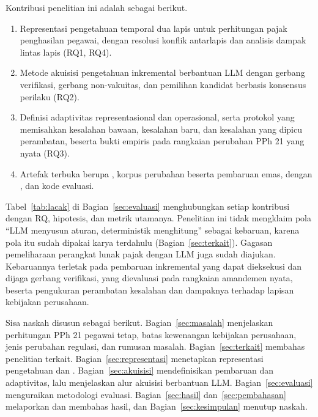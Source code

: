 Kontribusi penelitian ini adalah sebagai berikut.
\begin{enumerate}[label=\textbf{K\arabic*},leftmargin=*,nosep]
  \item Representasi pengetahuan temporal dua lapis untuk perhitungan pajak penghasilan pegawai, dengan resolusi konflik antarlapis dan analisis dampak lintas lapis (RQ1, RQ4).
  \item Metode akuisisi pengetahuan inkremental berbantuan LLM dengan gerbang verifikasi, gerbang non-vakuitas, dan pemilihan kandidat berbasis konsensus perilaku (RQ2).
  \item Definisi adaptivitas representasional dan operasional, serta protokol  yang memisahkan kesalahan bawaan, kesalahan baru, dan kesalahan yang dipicu perambatan, beserta bukti empiris pada rangkaian perubahan PPh 21 yang nyata (RQ3).
  \item Artefak terbuka berupa , korpus perubahan beserta pembaruan emas,  dengan , dan kode evaluasi.
\end{enumerate}
Tabel~\ref{tab:lacak} di Bagian~\ref{sec:evaluasi} menghubungkan setiap kontribusi dengan RQ, hipotesis, dan metrik utamanya. Penelitian ini tidak mengklaim pola ``LLM menyusun aturan,  deterministik menghitung'' sebagai kebaruan, karena pola itu sudah dipakai karya terdahulu (Bagian~\ref{sec:terkait}). Gagasan pemeliharaan perangkat lunak pajak dengan LLM juga sudah diajukan. Kebaruannya terletak pada pembaruan inkremental  yang dapat dieksekusi dan dijaga gerbang verifikasi, yang dievaluasi pada rangkaian amandemen nyata, beserta pengukuran perambatan kesalahan dan dampaknya terhadap lapisan kebijakan perusahaan.

Sisa naskah disusun sebagai berikut. Bagian~\ref{sec:masalah} menjelaskan perhitungan PPh 21 pegawai tetap, batas kewenangan kebijakan perusahaan, jenis perubahan regulasi, dan rumusan masalah. Bagian~\ref{sec:terkait} membahas penelitian terkait. Bagian~\ref{sec:representasi} menetapkan representasi pengetahuan dan . Bagian~\ref{sec:akuisisi} mendefinisikan pembaruan dan adaptivitas, lalu menjelaskan alur akuisisi berbantuan LLM. Bagian~\ref{sec:evaluasi} menguraikan metodologi evaluasi. Bagian~\ref{sec:hasil} dan~\ref{sec:pembahasan} melaporkan dan membahas hasil, dan Bagian~\ref{sec:kesimpulan} menutup naskah.
